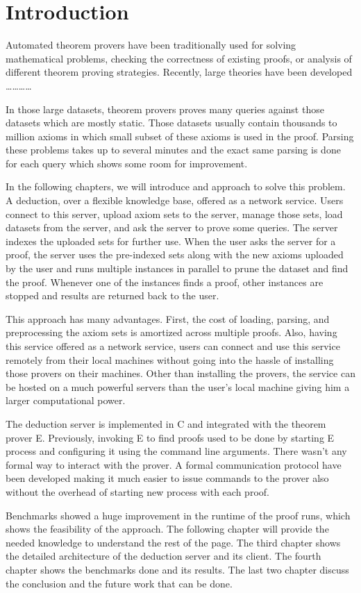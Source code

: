 \chapter{Introduction}
\label{chap:intro}

Automated theorem provers have been traditionally used for solving mathematical problems, checking the correctness of existing proofs, or analysis of different theorem proving strategies. Recently, large theories have been developed \ldots\ldots\ldots\ldots

In those large datasets, theorem provers proves many queries against those datasets which are mostly static. Those datasets usually contain thousands to million axioms in which small subset of these axioms is used in the proof. Parsing these problems takes up to several minutes and the exact same parsing is done for each query which shows some room for improvement.

In the following chapters, we will introduce and approach to solve this problem. A deduction, over a flexible knowledge base, offered as a network service. Users connect to this server, upload axiom sets to the server, manage those sets, load datasets from the server, and ask the server to prove some queries. The server indexes the uploaded sets for further use. When the user asks the server for a proof, the server uses the pre-indexed sets along with the new axioms uploaded by the user and runs multiple instances in parallel to prune the dataset and find the proof. Whenever one of the instances finds a proof, other instances are stopped and results are returned back to the user.

This approach has many advantages. First, the cost of loading, parsing, and preprocessing the axiom sets is amortized across multiple proofs. Also, having this service offered as a network service, users can connect and use this service remotely from their local machines without going into the hassle of installing those provers on their machines. Other than installing the provers, the service can be hosted on a much powerful servers than the user's local machine giving him a larger computational power.

The deduction server is implemented in C and integrated with the theorem prover E\cite{Schulz:AICOM-2002,Schulz:LPAR-2013}. Previously, invoking E to find proofs used to be done by starting E process and configuring it using the command line arguments. There wasn't any formal way to interact with the prover. A formal communication protocol have been developed making it much easier to issue commands to the prover also without the overhead of starting new process with each proof.

Benchmarks showed a huge improvement in the runtime of the proof runs, which shows the feasibility of the approach. The following chapter will provide the needed knowledge to understand the rest of the page. The third chapter shows the detailed architecture of the deduction server and its client. The fourth chapter shows the benchmarks done and its results. The last two chapter discuss the conclusion and the future work that can be done.
